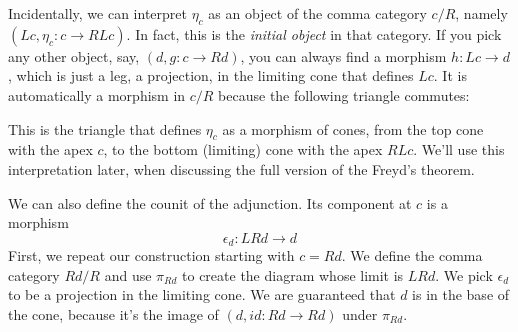 \documentclass[11pt]{amsart}
\begin{document}
\begin{figure}[H]
\end{figure}



Incidentally, we can interpret $\eta_c$ as an object of the comma category $c/R$, namely $(Lc, \eta_c \colon c \to R L c)$. In fact, this is the \emph{initial object} in that category. If you pick any other object, say, $(d, g \colon c \to R d)$, you can always find a morphism $h \colon L c \to d$, which is just a leg, a projection, in the limiting cone that defines $L c$. It is automatically a morphism in $c/R$ because the following triangle commutes:

\begin{figure}[H]
\centering
\end{figure}
This is the triangle that defines $\eta_c$ as a morphism of cones, from the top cone with the apex $c$, to the bottom (limiting) cone with the apex $R L c$. We'll use this interpretation later, when discussing the full version of the Freyd's theorem.

We can also define the counit of the adjunction. Its component at $c$ is a morphism
\[\epsilon_d : L R d \to d \]
First, we repeat our construction starting with $c = R d$. We define the comma category $R d / R$ and use $\pi_{R d}$ to create the diagram whose limit is $L R d$. We pick $\epsilon_d$ to be a projection in the limiting cone. We are guaranteed that $d$ is in the base of the cone, because it's the image of $(d, id \colon R d \to R d)$ under $\pi_{R d}$. 
\end{document}
